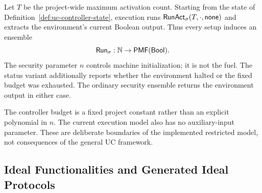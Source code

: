 \begin{definition}
\label{def:uc-execution-ensemble}
\leanok
Let \(T\) be the project-wide maximum activation count.  Starting from the
state of Definition~\ref{def:uc-controller-state}, execution runs
\(\mathsf{RunAct}_\sigma(T,\cdot,\mathsf{none})\) and extracts the environment's current
Boolean output.  Thus every setup induces an ensemble
\[
  \mathsf{Run}_\sigma:\mathbb{N}\to\mathsf{PMF}(\mathsf{Bool}).
\]
The security parameter \(n\) controls machine initialization; it is not the
fuel.  The status variant additionally reports whether the environment halted
or the fixed budget was exhausted.  The ordinary security ensemble returns the
environment output in either case.
\end{definition}

\begin{remark}
\label{rem:uc-execution-boundaries}
The controller budget is a fixed project constant rather than an explicit
polynomial in \(n\).  The current execution model also has no auxiliary-input
parameter.  These are deliberate boundaries of the implemented restricted
model, not consequences of the general UC framework.
\end{remark}

\subsection{Ideal Functionalities and Generated Ideal Protocols}

